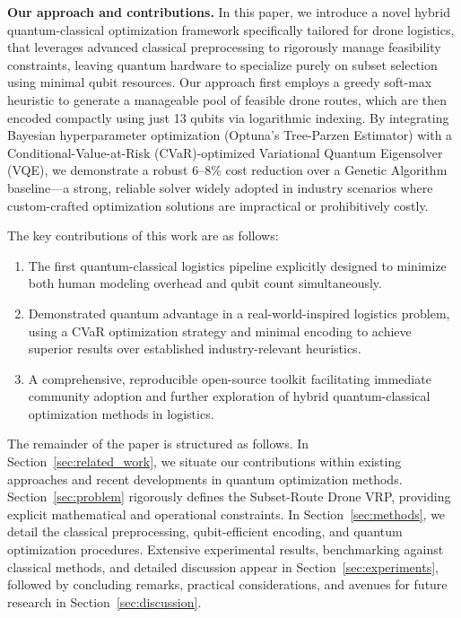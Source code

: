 \textbf{Our approach and contributions.} 
In this paper, we introduce a novel hybrid quantum-classical optimization framework specifically tailored for drone logistics,
that leverages advanced classical preprocessing to rigorously manage feasibility constraints,
leaving quantum hardware to specialize purely on subset selection using minimal qubit resources.
Our approach first employs a greedy soft-max heuristic to generate a manageable pool of feasible drone routes,
which are then encoded compactly using just 13 qubits via logarithmic indexing.
By integrating Bayesian hyperparameter optimization (Optuna's Tree-Parzen Estimator) 
with a Conditional-Value-at-Risk (CVaR)-optimized Variational Quantum Eigensolver (VQE),
we demonstrate a robust 6–8\% cost reduction over a Genetic Algorithm baseline—a strong,
reliable solver widely adopted in industry scenarios where custom-crafted optimization
solutions are impractical or prohibitively costly.

The key contributions of this work are as follows:
\begin{enumerate}
\item The first quantum-classical logistics pipeline explicitly designed to minimize both human modeling overhead and qubit count simultaneously.
\item Demonstrated quantum advantage in a real-world-inspired logistics problem, using a CVaR optimization strategy and minimal encoding to achieve superior results over established industry-relevant heuristics.
\item A comprehensive, reproducible open-source toolkit facilitating immediate community adoption and further exploration of hybrid quantum-classical optimization methods in logistics.
\end{enumerate}

The remainder of the paper is structured as follows. 
In Section~\ref{sec:related_work}, we situate our contributions within existing approaches and recent developments in quantum optimization methods.
Section~\ref{sec:problem} rigorously defines the Subset-Route Drone VRP, providing explicit mathematical and operational constraints.
In Section~\ref{sec:methods}, we detail the classical preprocessing, qubit-efficient encoding, and quantum optimization procedures.
Extensive experimental results, benchmarking against classical methods, and detailed discussion appear in Section~\ref{sec:experiments},
followed by concluding remarks, practical considerations, and avenues for future research in Section~\ref{sec:discussion}.